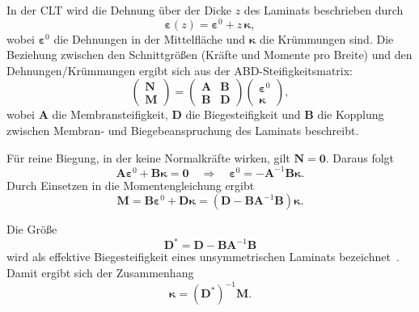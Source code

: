 In der CLT wird die Dehnung über der Dicke $z$ des Laminats beschrieben durch
\begin{equation}
\boldsymbol{\varepsilon}(z) = \boldsymbol{\varepsilon}^0 + z\,\boldsymbol{\kappa},
\end{equation}
wobei $\boldsymbol{\varepsilon}^0$ die Dehnungen in der Mittelfläche und $\boldsymbol{\kappa}$ die Krümmungen sind. Die Beziehung zwischen den Schnittgrößen (Kräfte und Momente pro Breite) und den Dehnungen/Krümmungen ergibt sich aus der ABD-Steifigkeitsmatrix:
\begin{equation}
\begin{pmatrix}
\mathbf{N} \\
\mathbf{M}
\end{pmatrix}
=
\begin{pmatrix}
\mathbf{A} & \mathbf{B} \\
\mathbf{B} & \mathbf{D}
\end{pmatrix}
\begin{pmatrix}
\boldsymbol{\varepsilon}^0 \\
\boldsymbol{\kappa}
\end{pmatrix},
\end{equation}
wobei $\mathbf{A}$ die Membransteifigkeit, $\mathbf{D}$ die Biegesteifigkeit und  $\mathbf{B}$ die Kopplung zwischen Membran- und Biegebeanspruchung des Laminats beschreibt.

Für reine Biegung, in der keine Normalkräfte wirken, gilt $\mathbf{N} = \mathbf{0}$. Daraus folgt
\begin{equation}
\mathbf{A}\boldsymbol{\varepsilon}^0 + \mathbf{B}\boldsymbol{\kappa} = \mathbf{0}
\quad\Rightarrow\quad
\boldsymbol{\varepsilon}^0 = -\mathbf{A}^{-1} \mathbf{B} \boldsymbol{\kappa}.
\end{equation}
Durch Einsetzen in die Momentengleichung ergibt
\begin{equation}
\mathbf{M} = \mathbf{B} \boldsymbol{\varepsilon}^0 + \mathbf{D} \boldsymbol{\kappa} = 
\left( \mathbf{D} - \mathbf{B} \mathbf{A}^{-1} \mathbf{B} \right) \boldsymbol{\kappa}.
\end{equation}

Die Größe
\begin{equation}
\mathbf{D}^* = \mathbf{D} - \mathbf{B} \mathbf{A}^{-1} \mathbf{B}
\end{equation}
wird als effektive Biegesteifigkeit eines unsymmetrischen Laminats bezeichnet~\cite{Jones2018}. 
Damit ergibt sich der Zusammenhang
\begin{equation}
\boldsymbol{\kappa} = (\mathbf{D}^*)^{-1} \mathbf{M}.
\end{equation}

